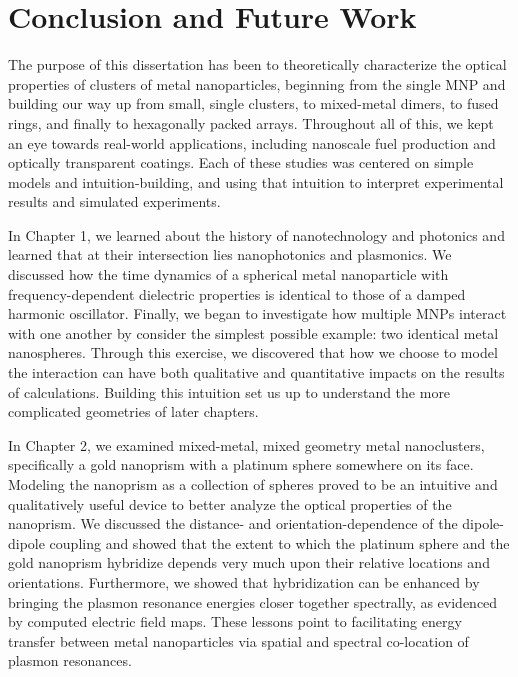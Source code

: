 \documentclass [11pt, proquest] {uwthesis}[2016/11/22]
\begin{document}

\chapter{Conclusion and Future Work}

The purpose of this dissertation has been to theoretically characterize the optical properties of clusters of metal nanoparticles, beginning from the single MNP and building our way up from small, single clusters, to mixed-metal dimers, to fused rings, and finally to hexagonally packed arrays. Throughout all of this, we kept an eye towards real-world applications, including nanoscale fuel production and optically transparent coatings. Each of these studies was centered on simple models and intuition-building, and using that intuition to interpret experimental results and simulated experiments.

In Chapter 1, we learned about the history of nanotechnology and photonics and learned that at their intersection lies nanophotonics and plasmonics. We discussed how the time dynamics of a spherical metal nanoparticle with frequency-dependent dielectric properties is identical to those of a damped harmonic oscillator. Finally, we began to investigate how multiple MNPs interact with one another by consider the simplest possible example: two identical metal nanospheres. Through this exercise, we discovered that how we choose to model the interaction can have both qualitative and quantitative impacts on the results of calculations. Building this intuition set us up to understand the more complicated geometries of later chapters.

In Chapter 2, we examined mixed-metal, mixed geometry metal nanoclusters, specifically a gold nanoprism with a platinum sphere somewhere on its face. Modeling the nanoprism as a collection of spheres proved to be an intuitive and qualitatively useful device to better analyze the optical properties of the nanoprism. We discussed the distance- and orientation-dependence of the dipole-dipole coupling and showed that the extent to which the platinum sphere and the gold nanoprism hybridize depends very much upon their relative locations and orientations. Furthermore, we showed that hybridization can be enhanced by bringing the plasmon resonance energies closer together spectrally, as evidenced by computed electric field maps. These lessons point to facilitating energy transfer between metal nanoparticles via spatial and spectral co-location of plasmon resonances.
\end{document}
